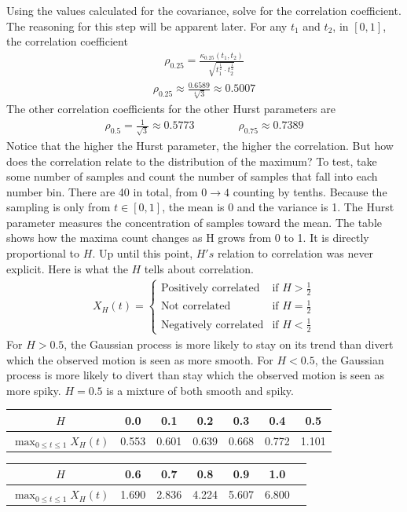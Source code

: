 \documentclass{article}
\newcommand{\NL}{\newline
\newline}
\begin{document}
\NL
Using the values calculated for the covariance, solve for the correlation coefficient. The reasoning for this step will be apparent later. For any $t_1$ and $t_2$, in $[0,1]$, the correlation coefficient
\begin{align*}
    \rho_{0.25}=\frac{\kappa_{0.25}(t_1,t_2)}{\sqrt{t_1^{\frac{1}{2}}\cdot t_2^{\frac{1}{2}}}}
\end{align*}
\begin{align*}
    \rho_{0.25}\approx \frac{0.6589}{\sqrt[4]{3}}\approx 0.5007
\end{align*}
The other correlation coefficients for the other Hurst parameters are
\begin{align*}
    \rho_{0.5}=\frac{1}{\sqrt{3}}\approx 0.5773\qquad \qquad \rho_{0.75}\approx0.7389
\end{align*}
Notice that the higher the Hurst parameter, the higher the correlation. But how does the correlation relate to the distribution of the maximum? To test, take some number of samples and count the number of samples that fall into each number bin. There are 40 in total, from $0\to4$ counting by tenths. Because the sampling is only from $t\in [0,1]$, the mean is 0 and the variance is 1. The Hurst parameter measures the concentration of samples toward the mean. The table shows how the maxima count changes as H grows from 0 to 1. It is directly proportional to $H$. Up until this point, $H's$ relation to correlation was never explicit. Here is what the $H$ tells about correlation.
\begin{align*}
    X_H(t)=\begin{cases}
        \text{Positively correlated}& \text{if }H> \frac{1}{2}\\
        \text{Not correlated}& \text{if } H= \frac{1}{2}\\
        \text{Negatively correlated}& \text{if } H< \frac{1}{2}
    \end{cases}
\end{align*}
For $H>0.5$, the Gaussian process is more likely to stay on its trend than divert which the observed motion is seen as more smooth. For $H<0.5$, the Gaussian process is more likely to divert than stay which the observed motion is seen as more spiky. $H=0.5$ is a mixture of both smooth and spiky.
\begin{table}[h]
\centering
\begin{tabular}{|c|c|c|c|c|c|c|}
    \hline
    $H$ & 0.0 & 0.1 & 0.2 & 0.3 & 0.4 & 0.5\\
    \hline
    $\max_{0\leq t\leq1}X_H(t)$ & 0.553 & 0.601 & 0.639 & 0.668 & 0.772 & 1.101\\
    \hline
\end{tabular}
\end{table}
\begin{table}[h]
\centering
\begin{tabular}{|c|c|c|c|c|c|c|}
    \hline
    $H$ & 0.6 & 0.7 & 0.8 & 0.9 & 1.0 \\
    \hline
    $\max_{0\leq t\leq1}X_H(t)$ & 1.690 & 2.836 & 4.224 & 5.607 & 6.800\\
    \hline
\end{tabular}
\end{table}
\end{document}
